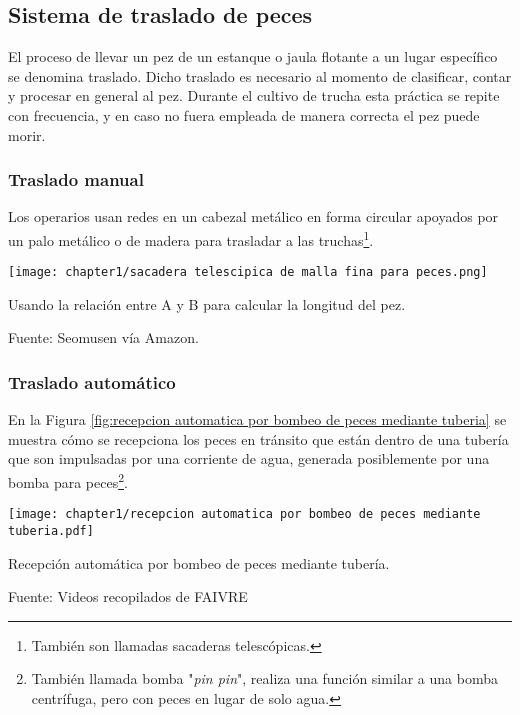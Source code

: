 \subsection{Sistema de traslado de peces}

El proceso de llevar un pez de un estanque o jaula flotante a un lugar específico se denomina traslado. Dicho traslado es necesario al momento de clasificar, contar y procesar en general al pez. Durante el cultivo de trucha esta práctica se repite con frecuencia, y en caso no fuera empleada de manera correcta el pez puede morir.

\subsubsection{Traslado manual}

Los operarios usan redes en un cabezal metálico en forma circular apoyados por un palo metálico o de madera para trasladar a las truchas\footnote{También son llamadas sacaderas telescópicas.}.

\begin{myfigure}[H]
	\footnotesize\centering
	\texttt{[image: chapter1/sacadera telescipica de malla fina para peces.png]}
	\caption{Usando la relación  entre A y B para calcular la longitud del pez.}
	\begin{myflushcenter}
		Fuente: Seomusen vía Amazon.
	\end{myflushcenter}	
	\label{fig:sacadera telescipica de malla fina para peces}
\end{myfigure}

\subsubsection{Traslado automático}

En la Figura \ref{fig:recepcion automatica por bombeo de peces mediante tuberia} se muestra cómo se recepciona los peces en tránsito que están dentro de una tubería que son impulsadas por una corriente de agua, generada posiblemente por una bomba para peces\footnote{También llamada bomba "\textit{pin pin}", realiza una función similar a una bomba centrífuga, pero con peces en lugar de solo agua.}.

\begin{myfigure}[H]
	\footnotesize\centering
	\texttt{[image: chapter1/recepcion automatica por bombeo de peces mediante tuberia.pdf]}
	\caption{Recepción automática por bombeo de peces mediante tubería.}
	\begin{myflushcenter}
		Fuente: Videos recopilados de FAIVRE
	\end{myflushcenter}
	\label{fig:recepcion automatica por bombeo de peces mediante tuberia}
\end{myfigure}

